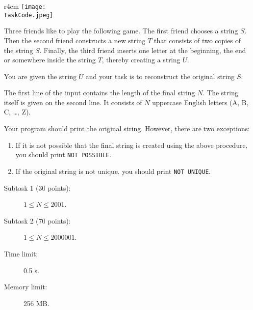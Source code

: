 \documentclass{boi2014}
\renewcommand{\TaskCode}{friends}
\begin{document}
    \begin{wrapfigure}{r}{4cm}
        \vspace{-24pt}
		\texttt{[image: \\TaskCode.jpeg]}
	\end{wrapfigure}
    Three friends like to play the following game.
    The first friend chooses a string $S$.
    Then the second friend constructs a new string $T$ that consists of
    two copies of the string $S$. 
    Finally, the third friend inserts one letter at the beginning, the end or somewhere
    inside the string $T$, thereby creating a string $U$.

    \Task
    You are given the string $U$ and your task is to reconstruct the original string $S$.

    \Input
    The first line of the input contains the length of the final string $N$.
    The string itself is given on the second line. It consists of $N$
    uppercase English letters (A, B, C, \ldots{}, Z).

    \Output
    Your program should print the original string.
    However, there are two exceptions:
    \begin{enumerate}
        \item If it is not possible that the final string is created using the above
        procedure, you should print {\tt NOT POSSIBLE}.
        \item If the original string is not unique, you should print {\tt NOT
        UNIQUE}.
    \end{enumerate}

    \Examples


    \Scoring

    \begin{description}
        \item[Subtask 1 (30 points):] $1 \le N \le 2001$.
        \item[Subtask 2 (70 points):] $1 \le N \le 2000001$.
    \end{description}

    \Constraints

    \begin{description}
        \item[Time limit:] 0.5 s.
        \item[Memory limit:] 256 MB.
    \end{description}
\end{document}
